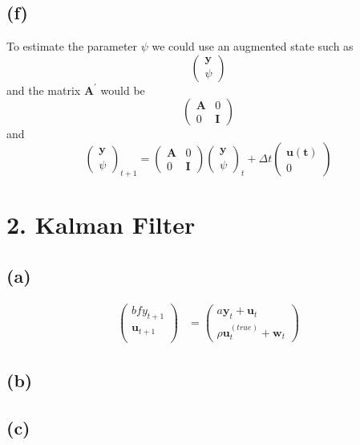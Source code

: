 \documentclass[fleqn, letterpaper]{tufte-handout}
\begin{document}
\subsection{(f)}
To estimate the parameter $\psi$ we could use an augmented state such as
\[\begin{pmatrix}\mathbf{y} \\ \psi\end{pmatrix}\]
and the matrix $\mathbf{A^\prime}$ would be 
\[\begin{pmatrix}\mathbf{A} & 0\\0& \mathbf{I}\end{pmatrix}\]
and
\[\begin{pmatrix}\mathbf{y} \\ \psi\end{pmatrix}_{t+1} =
\begin{pmatrix}\mathbf{A} & 0\\0& \mathbf{I}\end{pmatrix}
\begin{pmatrix}\mathbf{y} \\ \psi\end{pmatrix}_t +
\Delta t\begin{pmatrix}\mathbf{u(t)} \\ 0\end{pmatrix}
\]
\section{2. Kalman Filter}

\subsection{(a)}
\begin{align*}
\begin{pmatrix}
bf{y}_{t+1} \\
\mathbf{u}_{t+1} \\
\end{pmatrix}
&=
\begin{pmatrix}
a\mathbf{y}_t + \mathbf{u}_t \\
\rho\mathbf{u}^{(true)}_t+ \mathbf{w}_t
\end{pmatrix}
\end{align*}

\subsection{(b)}

\subsection{(c)}
{\scriptsize
        \begin{minipage}{\linewidth}
                
        \end{minipage}
}
\end{document}
